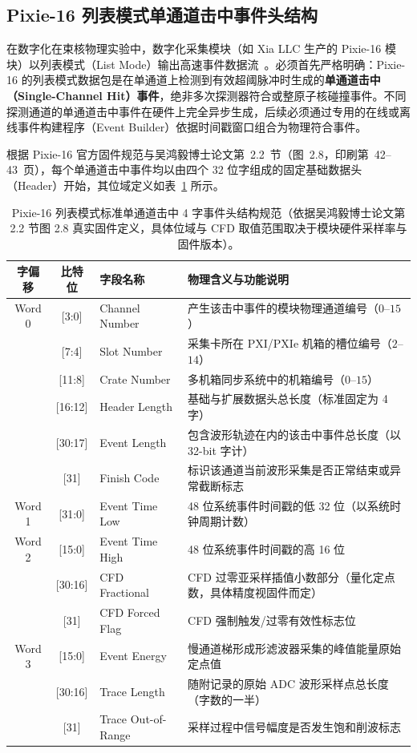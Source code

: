 \subsection{Pixie-16 列表模式单通道击中事件头结构}

在数字化在束核物理实验中，数字化采集模块（如 Xia LLC 生产的 Pixie-16 模块）以列表模式（List Mode）输出高速事件数据流~\cite{wu-hongyi-2020-general-purpose-digital-daq-thesis, doctoral-r1-g32-hennig-2007-pixie16-multi-chassis-sync}。必须首先严格明确：Pixie-16 的列表模式数据包是在单通道上检测到有效超阈脉冲时生成的\textbf{单通道击中（Single-Channel Hit）事件}，绝非多次探测器符合或整原子核碰撞事件。不同探测通道的单通道击中事件在硬件上完全异步生成，后续必须通过专用的在线或离线事件构建程序（Event Builder）依据时间戳窗口组合为物理符合事件。

根据 Pixie-16 官方固件规范与吴鸿毅博士论文第~2.2~节（图~2.8，印刷第~42--43~页），每个单通道击中事件均以由四个 32 位字组成的固定基础数据头（Header）开始，其位域定义如表~\ref{tab:appE-pixie-header} 所示。

\begin{table}[!htbp]
\centering
\small
\caption{Pixie-16 列表模式标准单通道击中 4 字事件头结构规范（依据吴鸿毅博士论文第 2.2 节图 2.8 真实固件定义，具体位域与 CFD 取值范围取决于模块硬件采样率与固件版本）。}\label{tab:appE-pixie-header}
\begin{tabular}{cclp{7.5cm}}
\toprule
字偏移 & 比特位 & 字段名称 & 物理含义与功能说明 \\
\midrule
Word 0 & [3:0]   & Channel Number    & 产生该击中事件的模块物理通道编号（$0$--$15$） \\
       & [7:4]   & Slot Number       & 采集卡所在 PXI/PXIe 机箱的槽位编号（$2$--$14$） \\
       & [11:8]  & Crate Number      & 多机箱同步系统中的机箱编号（$0$--$15$） \\
       & [16:12] & Header Length     & 基础与扩展数据头总长度（标准固定为 4 字） \\
       & [30:17] & Event Length      & 包含波形轨迹在内的该击中事件总长度（以 32-bit 字计） \\
       & [31]    & Finish Code       & 标识该通道当前波形采集是否正常结束或异常截断标志 \\
\midrule
Word 1 & [31:0]  & Event Time Low    & 48 位系统事件时间戳的低 32 位（以系统时钟周期计数） \\
\midrule
Word 2 & [15:0]  & Event Time High   & 48 位系统事件时间戳的高 16 位 \\
       & [30:16] & CFD Fractional    & CFD 过零亚采样插值小数部分（量化定点数，具体精度视固件而定） \\
       & [31]    & CFD Forced Flag   & CFD 强制触发/过零有效性标志位 \\
\midrule
Word 3 & [15:0]  & Event Energy      & 慢通道梯形成形滤波器采集的峰值能量原始定点值 \\
       & [30:16] & Trace Length      & 随附记录的原始 ADC 波形采样点总长度（字数的一半） \\
       & [31]    & Trace Out-of-Range& 采样过程中信号幅度是否发生饱和削波标志 \\
\bottomrule
\end{tabular}
\end{table}

